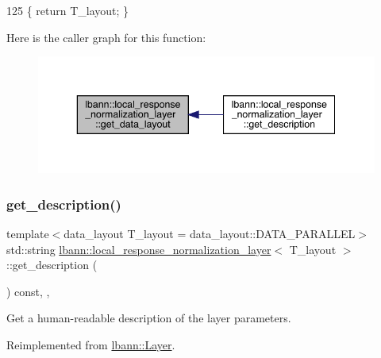 \begin{DoxyCode}
125 \{ \textcolor{keywordflow}{return} T\_layout; \}
\end{DoxyCode}
Here is the caller graph for this function\+:\nopagebreak
\begin{figure}[H]
\begin{center}
\leavevmode
\includegraphics[width=343pt]{classlbann_1_1local__response__normalization__layer_a7a161dde860f17264077a0cc4797fe36_icgraph}
\end{center}
\end{figure}
\mbox{\label{classlbann_1_1local__response__normalization__layer_a31f4ab1700e2e1c69a0ccb44c6f0fd69}} 
\subsubsection{\texorpdfstring{get\+\_\+description()}{get\_description()}}
{\footnotesize\ttfamily template$<$data\+\_\+layout T\+\_\+layout = data\+\_\+layout\+::\+D\+A\+T\+A\+\_\+\+P\+A\+R\+A\+L\+L\+EL$>$ \\
std\+::string \hyperlink{classlbann_1_1local__response__normalization__layer}{lbann\+::local\+\_\+response\+\_\+normalization\+\_\+layer}$<$ T\+\_\+layout $>$\+::get\+\_\+description (\begin{DoxyParamCaption}{ }\end{DoxyParamCaption}) const\hspace{0.3cm}{\ttfamily [inline]}, {\ttfamily [override]}, {\ttfamily [virtual]}}

Get a human-\/readable description of the layer parameters. 

Reimplemented from \hyperlink{classlbann_1_1Layer_acc0803d3428914ca1eb5988c4309174a}{lbann\+::\+Layer}.



